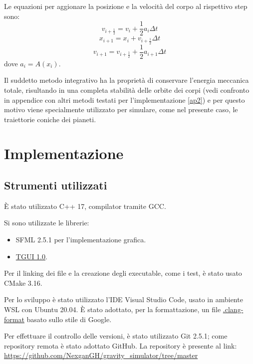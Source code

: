 \documentclass{article}
\begin{document}
Le equazioni per aggionare la posizione e la velocità del corpo al rispettivo step sono:
\begin{equation}
    v_{i+\frac{1}{2}}=v_{i}+\frac{1}{2}a_{i}\Delta t
\end{equation}
\begin{equation}
    x_{i+1}=x_{i}+v_{i+\frac{1}{2}}\Delta t
\end{equation}
\begin{equation}
    v_{i+1}=v_{i+\frac{1}{2}}+ \frac{1}{2}a_{i+1}\Delta t
\end{equation}
dove $a_{i}=A(x_{i})$.

Il suddetto metodo integrativo ha la proprietà di conservare l'energia meccanica totale, risultando in una completa stabilità delle orbite dei corpi (vedi confronto in appendice con altri metodi testati per l'implementazione \ref{ap2}) e per questo motivo viene specialmente utilizzato per simulare, come nel presente caso, le traiettorie coniche dei pianeti.

\section{Implementazione}
\subsection{Strumenti utilizzati}
È stato utilizzato C++ 17, compilator tramite GCC.

Si sono utilizzate le librerie:
\begin{itemize}
    \item SFML 2.5.1 per l'implementazione grafica.
    \item \href{https://tgui.eu/tutorials/1.0/linux/}{TGUI 1.0}.
\end{itemize}

Per il linking dei file e la creazione degli executable, come i test, è stato usato CMake 3.16.

Per lo sviluppo è stato utilizzato l'IDE Visual Studio Code, usato in ambiente WSL con Ubuntu 20.04. È stato adottato, per la formattazione, un file \href{https://github.com/NexganGH/gravity_simulator/blob/master/.clang-format}{.clang-format} basato sullo stile di Google.

Per effettuare il controllo delle versioni, è stato utilizzato Git 2.5.1; come repository remota è stato adottato GitHub. La repository è presente al link: \url{https://github.com/NexganGH/gravity_simulator/tree/master}
\end{document}
